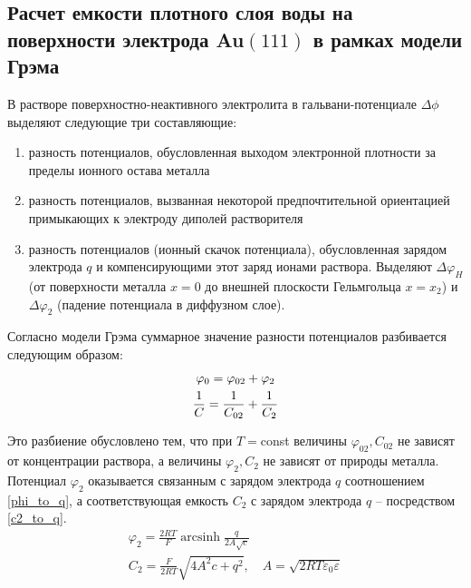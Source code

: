 \documentclass[13pt]{extarticle}
\DeclareMathOperator{\arcsinh}{arcsinh}
\begin{document}
\subsection*{Расчет емкости плотного слоя воды на поверхности электрода Au$(111)$ в рамках модели Грэма}

В растворе поверхностно-неактивного электролита в гальвани-потенциале $\Delta \phi$ выделяют следующие три составляющие:
\begin{enumerate}
	\item разность потенциалов, обусловленная выходом электронной плотности за пределы ионного остава металла
	\item разность потенциалов, вызванная некоторой предпочтительной ориентацией примыкающих к электроду диполей растворителя
	\item разность потенциалов (ионный скачок потенциала), обусловленная зарядом электрода $q$ и компенсирующими этот заряд ионами раствора. Выделяют $\Delta \varphi_H$ (от поверхности металла $x = 0$ до внешней плоскости Гельмгольца $x = x_2$) и $\Delta \varphi_2$ (падение потенциала в диффузном слое).
\end{enumerate}

Согласно модели Грэма суммарное значение разности потенциалов разбивается следующим образом:
\begin{gather}
	\varphi_0 = \varphi_{02} + \varphi_{2} \notag \\
	\frac{1}{C} = \frac{1}{C_{02}} + \frac{1}{C_2} \label{grem} 
\end{gather}

Это разбиение обусловлено тем, что при $T = $const величины $\varphi_{02}, C_{02}$ не зависят от концентрации раствора, а величины $\varphi_2, C_2$ не зависят от природы металла. Потенциал $\varphi_2$ оказывается связанным с зарядом электрода $q$ соотношением \eqref{phi_to_q}, а соответствующая емкость $C_2$ с зарядом электрода $q$ -- посредством \eqref{c2_to_q}.
\begin{gather}
	\varphi_2 = \frac{2RT}{F} \arcsinh \frac{q}{2 A \sqrt{c}} \label{phi_to_q} \\
	C_2 = \frac{F}{2 R T} \sqrt{4 A^2 c + q^2} \label{c2_to_q}, \quad A = \sqrt{2 R T \varepsilon_0 \varepsilon}
\end{gather}
\end{document}
